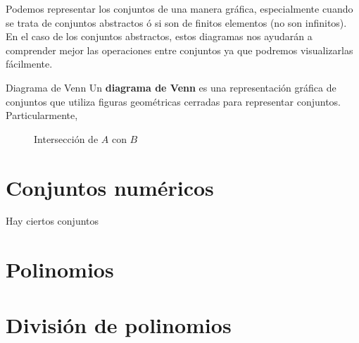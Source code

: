 \documentclass[11pt, twoside]{book}
\begin{document}
Podemos representar los conjuntos de una manera gráfica, especialmente cuando se trata de conjuntos abstractos ó si son de finitos elementos (no son infinitos). En el caso de los conjuntos abstractos, estos diagramas nos ayudarán a comprender mejor las operaciones entre conjuntos ya que podremos visualizarlas fácilmente.

\begin{definition}{Diagrama de Venn}
    Un \textbf{diagrama de Venn} es una representación gráfica de conjuntos que utiliza figuras geométricas cerradas para representar conjuntos. Particularmente,
         \begin{figure}[H]
                \centering
                \caption{Intersección de \(A\) con \(B\)}
        \end{figure}
\end{definition}

\section{Conjuntos numéricos}
Hay ciertos conjuntos

\section{Polinomios}

\section{División de polinomios}
\end{document}
